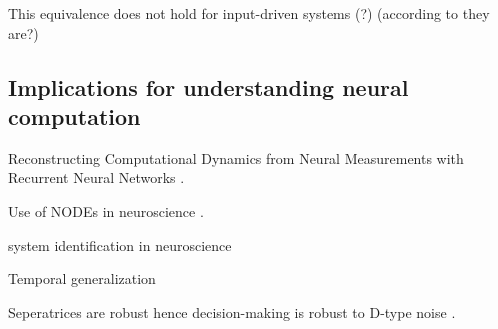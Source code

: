 \documentclass{article}
\newcounter{ct}
\begin{document}
This equivalence does not hold for input-driven systems (?)  (according to  \citep{dinc2025latentcomputing} they are?)



\subsection{Implications for understanding neural computation} 
Reconstructing Computational Dynamics from Neural Measurements with Recurrent Neural Networks  \citep{durstewitz2023reconstructing}.

Use of NODEs in neuroscience  \citep{kim2021inferring}.

system identification in neuroscience  \citep{han2023si} 

Temporal generalization

Seperatrices are robust hence decision-making is robust to D-type noise  \citep{Park2023a}.





\end{document}
